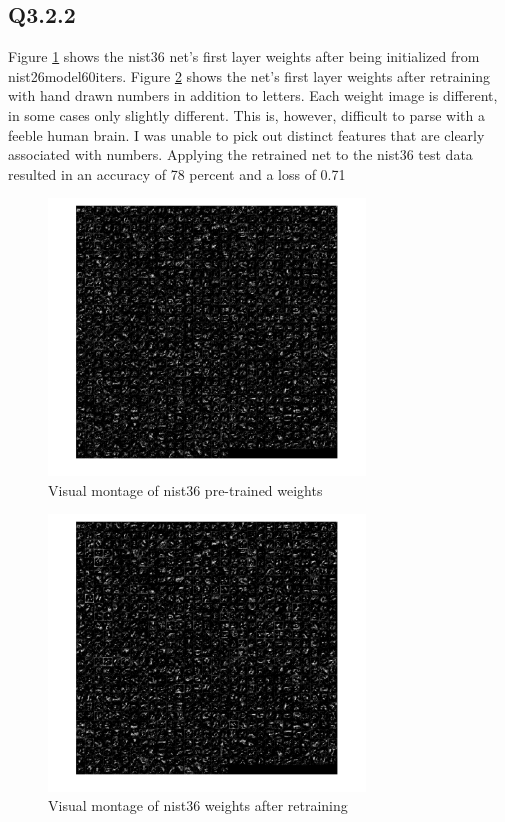 \documentclass[12pt]{article}
\begin{document}
\subsection{Q3.2.2}
Figure \ref{fig:nist36preweights} shows the nist36 net's first layer weights after being initialized from nist26model60iters. Figure \ref{fig:nist36retrainweights} shows the net's first layer weights after retraining with hand drawn numbers in addition to letters.
Each weight image is different, in some cases only slightly different. This is, however, difficult to parse with a feeble human brain. I was unable to pick out distinct features that are clearly associated with numbers.
Applying the retrained net to the nist36 test data resulted in an accuracy of 78 percent and a loss of 0.71
\begin{figure}[H]
\centering
\includegraphics[page=1,width=0.75\textwidth]{q322_pre}
\caption{ Visual montage of nist36 pre-trained weights } 
\label{fig:nist36preweights}
\end{figure}   

\begin{figure}[H]
\centering
\includegraphics[page=1,width=0.75\textwidth]{q322_retrain}
\caption{ Visual montage of nist36 weights after retraining } 
\label{fig:nist36retrainweights}
\end{figure}   
\end{document}
